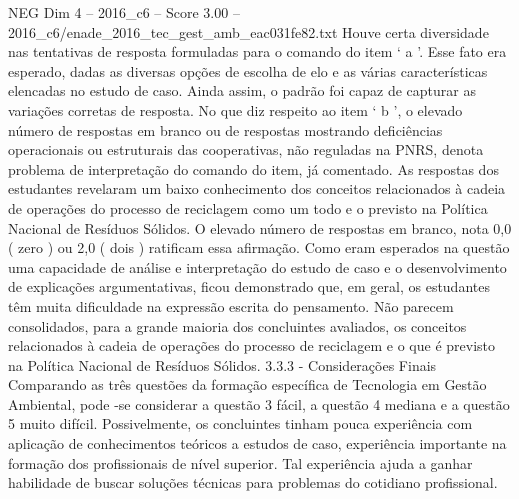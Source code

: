 \begin{textsample}{NEG Dim 4 – 2016\_c6 – Score 3.00 – 2016\_c6/enade\_2016\_tec\_gest\_amb\_eac031fe82.txt}
Houve certa diversidade nas tentativas de resposta formuladas para o comando do item ‘ a ’.
Esse fato era esperado, dadas as diversas opções de escolha de elo e as várias características elencadas no estudo de caso.
Ainda assim, o padrão foi capaz de capturar as variações corretas de resposta.
No que diz respeito ao item ‘ b ’, o elevado número de respostas em branco ou de respostas mostrando deficiências operacionais ou estruturais das cooperativas, não reguladas na PNRS, denota problema de interpretação do comando do item, já comentado.
As respostas dos estudantes revelaram um baixo conhecimento dos conceitos relacionados à cadeia de operações do processo de reciclagem como um todo e o previsto na Política Nacional de Resíduos Sólidos.
O elevado número de respostas em branco, nota 0,0 ( zero ) ou 2,0 ( dois ) ratificam essa afirmação.
Como eram esperados na questão uma capacidade de análise e interpretação do estudo de caso e o desenvolvimento de explicações argumentativas, ficou demonstrado que, em geral, os estudantes têm muita dificuldade na expressão escrita do pensamento.
Não parecem consolidados, para a grande maioria dos concluintes avaliados, os conceitos relacionados à cadeia de operações do processo de reciclagem e o que é previsto na Política Nacional de Resíduos Sólidos. 3.3.3 - Considerações Finais Comparando as três questões da formação específica de Tecnologia em Gestão Ambiental, pode -se considerar a questão 3 fácil, a questão 4 mediana e a questão 5 muito difícil.
Possivelmente, os concluintes tinham pouca experiência com aplicação de conhecimentos teóricos a estudos de caso, experiência importante na formação dos profissionais de nível superior.
Tal experiência ajuda a ganhar habilidade de buscar soluções técnicas para problemas do cotidiano profissional.

\end{textsample}
